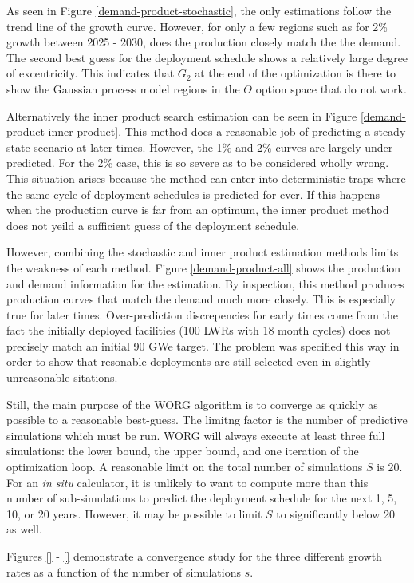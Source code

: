 As seen in Figure \ref{demand-product-stochastic}, the \stochastic only 
estimations follow the trend line of the growth curve.  However, for only 
a few regions such as for 2\% growth between 2025 - 2030, does the 
production closely match the the demand.  The second best guess for the 
deployment schedule shows a relatively large degree of excentricity. This 
indicates that $G_2$ at the end of the optimization is there to show the 
Gaussian process model regions in the $\Theta$ option space that do not work. 

Alternatively the inner product search estimation can be seen in Figure 
\ref{demand-product-inner-product}. This method does a reasonable job of
predicting a steady state scenario at later times. However, the 1\% and 2\%
curves are largely under-predicted.  For the 2\% case, this is so severe
as to be considered wholly wrong. This situation arises because the 
\innerprod method can enter into deterministic traps where the same cycle
of deployment schedules is predicted for ever.  If this happens when the 
production curve is far from an optimum, the inner product method does not
yeild a sufficient guess of the deployment schedule.

However, combining the stochastic and inner product estimation methods limits
the weakness of each method. Figure \ref{demand-product-all} shows the 
production and demand information for the \allflag estimation. By inspection, 
this method produces production curves that match the demand much more 
closely. This is especially true for later times. Over-prediction 
discrepencies for early times come from the fact the initially deployed 
facilities (100 LWRs with 18 month cycles) does not precisely match an 
initial 90 GWe target. The problem was specified this way in order to show 
that resonable deployments are still selected even in slightly 
unreasonable sitations.

Still, the main purpose of the WORG algorithm is to converge as quickly as 
possible to a reasonable best-guess. The limitng factor is the number of 
predictive simulations which must be run. WORG will always execute 
at least three full simulations: the lower bound, the upper bound, and one
iteration of the optimization loop. A reasonable limit on the total number 
of simulations $S$ is 20.  For an \emph{in situ} calculator, it is unlikely
to want to compute more than this number of sub-simulations to predict 
the deployment schedule for the next 1, 5, 10, or 20 years. However, it 
may be possible to limit $S$ to significantly below 20 as well.

Figures \ref{} - \ref{} demonstrate a convergence study for the three 
different growth rates as a function of the number of simulations $s$.



